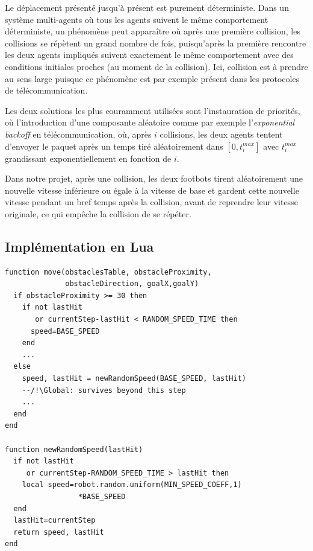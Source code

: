 \begin{subappendices}

Le déplacement présenté jusqu'à présent est purement déterministe. Dans un système multi-agents où tous les agents suivent le même comportement déterministe, un phénomène peut apparaître où après une première collision, les collisions se répètent un grand nombre de fois, puisqu'après la première rencontre les deux agents impliqués suivent exactement le même comportement avec des conditions initiales proches (au moment de la collision). Ici, collision est à prendre au sens large puisque ce phénomène est par exemple présent dans les protocoles de télécommunication.

Les deux solutions les plus couramment utilisées sont l'instauration de priorités, où l'introduction d'une composante aléatoire comme par exemple l'\emph{exponential backoff} en télécommunication, où, après $i$ collisions, les deux agents tentent d'envoyer le paquet après un temps tiré aléatoirement dans $[0,t^{max}_i]$ avec $t^{max}_i$ grandissant exponentiellement en fonction de $i$.~\cite{wikiBackoff}

Dans notre projet, après une collision, les deux footbots tirent aléatoirement une nouvelle vitesse inférieure ou égale à la vitesse de base et gardent cette nouvelle vitesse pendant un bref temps après la collision, avant de reprendre leur vitesse originale, ce qui empêche la collision de se répéter.
\vspace{-1em}
\subsection{Implémentation en Lua}
\vspace{-0.5em}
\begin{lstlisting}[caption=Vitesse aléaoire temporaire après évitement]
function move(obstaclesTable, obstacleProximity,
              obstacleDirection, goalX,goalY)
  if obstacleProximity >= 30 then
    if not lastHit
       or currentStep-lastHit < RANDOM_SPEED_TIME then
      speed=BASE_SPEED
    end
    ...
  else
    speed, lastHit = newRandomSpeed(BASE_SPEED, lastHit)
    --/!\Global: survives beyond this step
    ...
  end
end

function newRandomSpeed(lastHit)
  if not lastHit
     or currentStep-RANDOM_SPEED_TIME > lastHit then
    local speed=robot.random.uniform(MIN_SPEED_COEFF,1)
                 *BASE_SPEED
  end
  lastHit=currentStep
  return speed, lastHit
end
\end{lstlisting}

\end{subappendices}
